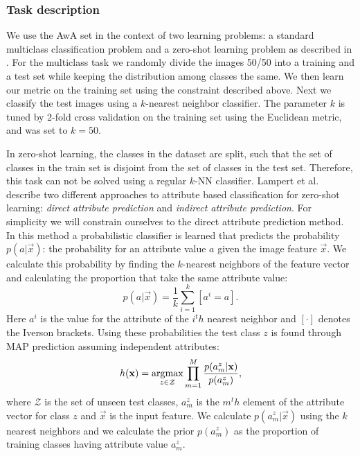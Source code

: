 \subsubsection{Task description}

We use the \ac{AwA} set in the context of two learning problems: a standard multiclass classification problem and a zero-shot learning problem as described in \cite{lampert2014attribute}. For the multiclass task we randomly divide the images 50/50 into a training and a test set while keeping the distribution among classes the same. We then learn our metric on the training set using the constraint described above. Next we classify the test images using a $k$-nearest neighbor classifier. The parameter $k$ is tuned by 2-fold cross validation on the training set using the Euclidean metric, and was set to $k = 50$.

In zero-shot learning, the classes in the dataset are split, such that the set of classes in the train set is disjoint from the set of classes in the test set. Therefore, this task can not be solved using a regular $k$-NN classifier. Lampert et al. describe two different approaches to  attribute based classification for zero-shot learning: \emph{direct attribute prediction} and \emph{indirect attribute prediction}. For simplicity we will constrain ourselves to the direct attribute prediction method. In this method  a probabilistic classifier is learned that predicts the probability $p(a | \vec{x})$: the probability for an attribute value $a$ given the image feature $\vec{x}$. We calculate this probability by finding the $k$-nearest neighbors of the feature vector and calculating the proportion that take the same attribute value:
\begin{equation}
p(a | \vec{x}) = \frac{1}{k} \sum_{i=1}^{k} \left[a^i = a\right].
\end{equation}
Here $a^i$ is the value for the attribute of the $i^th$ nearest neighbor and $[\cdot]$ denotes the Iverson brackets. Using these probabilities the test class $z$ is found through MAP prediction assuming independent attributes:
\begin{equation}
h(\mathbf{x}) = \operatorname*{arg\!\max}_{z \in \mathcal{Z}} \prod_{m=1}^{M}\frac{p(a^{z}_m | \mathbf{x})}{p(a^{z}_m)},
\end{equation}
where $\mathcal{Z}$ is the set of unseen test classes, $a^z_m$ is the $m^th$ element of the attribute vector for class $z$ and $\vec{x}$ is the input feature. We calculate $p(a^{z}_m | \vec{x})$ using the $k$ nearest neighbors and we calculate the prior $p(a^{z}_m)$ as the proportion of training classes having attribute value $a^{z}_m$.



